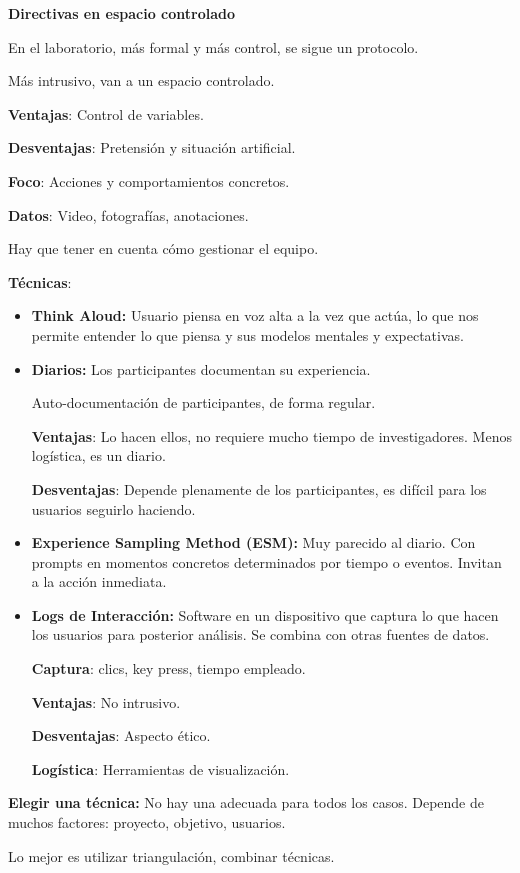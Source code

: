 \documentclass[12pt]{report} %
\begin{document}
\textbf{Directivas en espacio controlado}

En el laboratorio, más formal y más control, se sigue un protocolo.

Más intrusivo, van a un espacio controlado.

\textbf{Ventajas}: Control de variables.

\textbf{Desventajas}: Pretensión y situación artificial.

\textbf{Foco}: Acciones y comportamientos concretos.

\textbf{Datos}: Video, fotografías, anotaciones.

Hay que tener en cuenta cómo gestionar el equipo.

\textbf{Técnicas}:
\begin{itemize}
  \item \textbf{Think Aloud:} Usuario piensa en voz alta a la vez que
  actúa, lo que nos permite entender lo que piensa y sus modelos mentales
  y expectativas.
  \item \textbf{Diarios:} Los participantes documentan su experiencia.
  
  Auto-documentación de participantes, de forma regular.

  \textbf{Ventajas}: Lo hacen ellos, no requiere mucho tiempo
  de investigadores. Menos logística, es un diario.

  \textbf{Desventajas}: Depende plenamente de los
  participantes, es difícil para los usuarios seguirlo haciendo.
  \item \textbf{Experience Sampling Method (ESM):} Muy parecido al
  diario. Con prompts en momentos concretos determinados por tiempo o
  eventos. Invitan a la acción inmediata.
  \item \textbf{Logs de Interacción:} Software en un dispositivo
  que captura lo que hacen los usuarios para posterior análisis.     Se combina con otras fuentes de datos.

  
    \textbf{Captura}: clics, key press, tiempo empleado.

    \textbf{Ventajas}: No intrusivo.

    \textbf{Desventajas}: Aspecto ético.

    \textbf{Logística}: Herramientas de visualización.
\end{itemize}

\textbf{Elegir una técnica:} No hay una adecuada para todos los casos.
Depende de muchos factores: proyecto, objetivo, usuarios.

\hspace{0pt} Lo mejor es utilizar triangulación, combinar técnicas.
\end{document}

